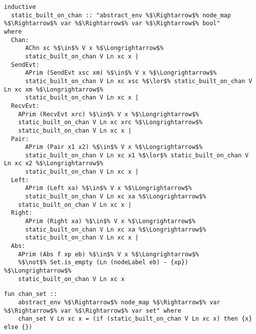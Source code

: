 \documentclass{article}
\begin{document}
\begin{lstlisting}[style=codestyle1, escapechar=\%]
inductive 
  static_built_on_chan :: "abstract_env %$\Rightarrow$% node_map %$\Rightarrow$% var %$\Rightarrow$% var %$\Rightarrow$% bool"
where
  Chan:
      AChn xc %$\in$% V x %$\Longrightarrow$% 
      static_built_on_chan V Ln xc x |
  SendEvt: 
      APrim (SendEvt xsc xm) %$\in$% V x %$\Longrightarrow$% 
      static_built_on_chan V Ln xc xsc %$\lor$% static_built_on_chan V Ln xc xm %$\Longrightarrow$% 
      static_built_on_chan V Ln xc x |
  RecvEvt:
    APrim (RecvEvt xrc) %$\in$% V x %$\Longrightarrow$% 
    static_built_on_chan V Ln xc xrc %$\Longrightarrow$% 
    static_built_on_chan V Ln xc x |
  Pair:
      APrim (Pair x1 x2) %$\in$% V x %$\Longrightarrow$%
      static_built_on_chan V Ln xc x1 %$\lor$% static_built_on_chan V Ln xc x2 %$\Longrightarrow$% 
      static_built_on_chan V Ln xc x |
  Left:
      APrim (Left xa) %$\in$% V x %$\Longrightarrow$% 
      static_built_on_chan V Ln xc xa %$\Longrightarrow$% 
    static_built_on_chan V Ln xc x |
  Right:
      APrim (Right xa) %$\in$% V x %$\Longrightarrow$% 
      static_built_on_chan V Ln xc xa %$\Longrightarrow$% 
      static_built_on_chan V Ln xc x |
  Abs:
    APrim (Abs f xp eb) %$\in$% V x %$\Longrightarrow$% 
    %$\not$% Set.is_empty (Ln (nodeLabel eb) - {xp}) %$\Longrightarrow$%
    static_built_on_chan V Ln xc x 
  \end{lstlisting}



\begin{lstlisting}[style=codestyle1, escapechar=\%]
  fun chan_set ::
    abstract_env %$\Rightarrow$% node_map %$\Rightarrow$% var %$\Rightarrow$% var %$\Rightarrow$% var set" where
    chan_set V Ln xc x = (if (static_built_on_chan V Ln xc x) then {x} else {})
  \end{lstlisting}
\end{document}
